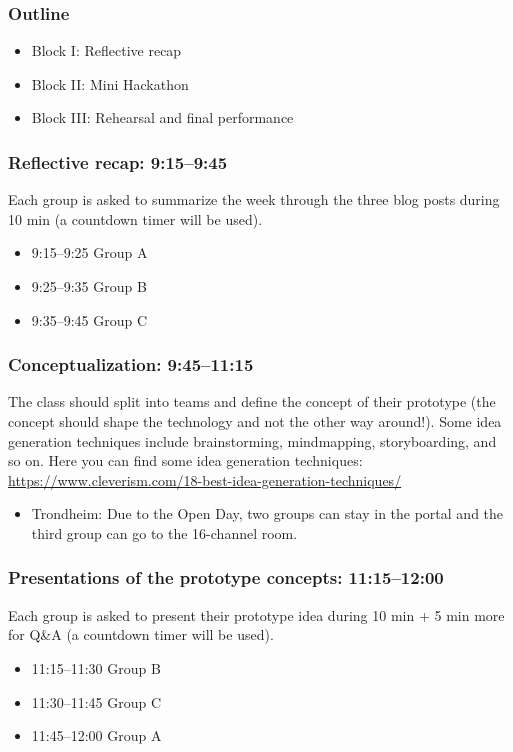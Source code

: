 \documentclass[screen, aspectratio=43]{beamer}
\begin{document}
%
\begin{frame}
  \frametitle{Outline}
      \begin{itemize}
	\item Block I: Reflective recap
	\item Block II: Mini Hackathon
	\item Block III: Rehearsal and final performance
    \end{itemize}  
\end{frame}
%
\begin{frame}
  \frametitle{Reflective recap: 9:15--9:45}
  Each group is asked to summarize the week through the three blog posts during 10 min (a countdown timer will be used). 
    \begin{itemize}
    	\item 9:15--9:25 Group A
	\item 9:25--9:35 Group B
	\item 9:35--9:45 Group C
    \end{itemize}
\end{frame}
%
\begin{frame}
  \frametitle{Conceptualization: 9:45--11:15}
  The class should split into teams and define the concept of their prototype (the concept should shape the technology and not the other way around!). Some idea generation techniques include brainstorming, mindmapping, storyboarding, and so on. Here you can find some idea generation techniques: \url{https://www.cleverism.com/18-best-idea-generation-techniques/}
    \begin{itemize}
    	\item Trondheim: Due to the Open Day, two groups can stay in the portal and the third group can go to the 16-channel room.
    \end{itemize}
\end{frame}
%
\begin{frame}
  \frametitle{Presentations of the prototype concepts: 11:15--12:00}
  Each group is asked to present their prototype idea during 10 min + 5 min more for Q\&A (a countdown timer will be used).
    \begin{itemize}
    	\item 11:15--11:30 Group B
	\item 11:30--11:45 Group C
	\item 11:45--12:00 Group A
    \end{itemize}
\end{frame}
%
\end{document}
